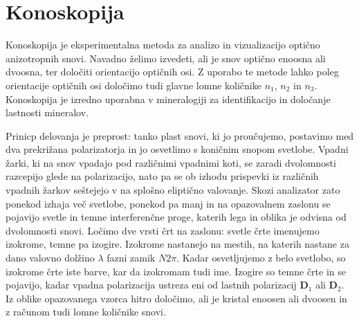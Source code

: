 \section{Konoskopija}
Konoskopija je eksperimentalna metoda za analizo in vizualizacijo optično anizotropnih snovi. 
Navadno želimo izvedeti, ali je snov optično enoosna ali dvoosna, ter določiti orientacijo 
optičnih osi. Z uporabo te metode lahko poleg orientacije optičnih osi določimo 
tudi glavne lomne količnike $n_1$, $n_2$ in $n_3$. Konoskopija je izredno uporabna v mineralogiji
za identifikacijo in določanje lastnosti mineralov.

Prinicp delovanja je preprost: tanko plast snovi, ki jo proučujemo, postavimo med dva prekrižana 
polarizatorja in jo osvetlimo s koničnim snopom svetlobe. Vpadni žarki, ki na snov vpadajo
pod različnimi vpadnimi koti, se zaradi dvolomnosti razcepijo glede na polarizacijo, nato 
pa se ob izhodu prispevki iz različnih vpadnih žarkov seštejejo v na splošno eliptično valovanje.
Skozi analizator zato ponekod izhaja več svetlobe, ponekod pa manj in na 
opazovalnem zaslonu se pojavijo svetle in temne interferenčne proge, katerih lega in oblika je 
odvisna od dvolomnosti snovi. Ločimo dve vrsti črt na zaslonu: svetle črte imenujemo izokrome, temne
pa izogire. Izokrome nastanejo na mestih, na katerih nastane za dano valovno dolžino $\lambda$ 
fazni zamik $N2\pi$. Kadar osvetljujemo z belo svetlobo, so izokrome črte iste barve, kar da
izokromam tudi ime. Izogire so temne črte in se pojavijo, kadar vpadna
polarizacija ustreza eni od lastnih polarizacij $\mathbf{D}_1$ ali $\mathbf{D}_2$. Iz oblike
opazovanega vzorca hitro določimo, ali je kristal enoosen ali dvoosen in z računom tudi lomne
količnike snovi.
